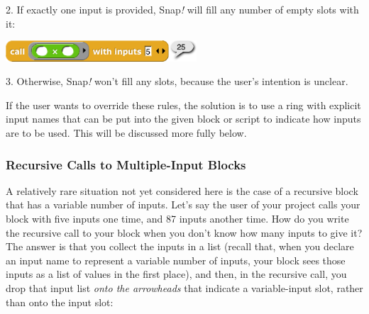 2. If exactly one input is provided, Snap\emph{!} will fill any number
of empty slots with it:

\includegraphics[width=2.80208in,height=0.30694in]{media/image712.png}

3. Otherwise, Snap\emph{!} won't fill any slots, because the user's
intention is unclear.

If the user wants to override these rules, the solution is to use a ring
with explicit input names that can be put into the given block or script
to indicate how inputs are to be used. This will be discussed more fully
below.

\subsubsection{Recursive Calls to Multiple-Input
Blocks}\label{recursive-calls-to-multiple-input-blocks}

A relatively rare situation not yet considered here is the case of a
recursive block that has a variable number of inputs. Let's say the user
of your project calls your block with five inputs one time, and 87
inputs another time. How do you write the recursive call to your block
when you don't know how many inputs to give it? The answer is that you
collect the inputs in a list (recall that, when you declare an input
name to represent a variable number of inputs, your block sees those
inputs as a list of values in the first place), and then, in the
recursive call, you drop that input list \emph{onto the arrowheads} that
indicate a variable-input slot, rather than onto the input slot:

